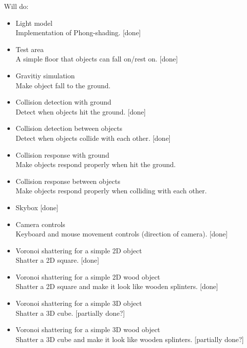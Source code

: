 \documentclass[10pt]{article}
\begin{document}
Will do:
\begin{itemize}
  \item Light model \hfill \\
  Implementation of Phong-shading. [done]
  \item Test area \hfill \\
  A simple floor that objects can fall on/rest on. [done]
  \item Gravitiy simulation \hfill \\
  Make object fall to the ground.
  \item Collision detection with ground \hfill \\
  Detect when objects hit the ground. [done]
  \item Collision detection between objects \hfill \\
  Detect when objects collide with each other. [done]
  \item Collision response with ground \hfill \\
  Make objects respond properly when hit the ground.
  \item Collision response between objects \hfill \\
  Make objects respond properly when colliding with each other.
  \item Skybox [done]
  \item Camera controls \hfill \\
  Keyboard and mouse movement controls (direction of camera). [done]
  \item Voronoi shattering for a simple 2D object \hfill \\
  Shatter a 2D square. [done]
  \item Voronoi shattering for a simple 2D wood object \hfill \\
  Shatter a 2D square and make it look like wooden splinters. [done]
  \item Voronoi shattering for a simple 3D object \hfill \\
  Shatter a 3D cube. [partially done?]
  \item Voronoi shattering for a simple 3D wood object \hfill \\
  Shatter a 3D cube and make it look like wooden splinters. [partially done?]

\end{itemize}
\end{document}
